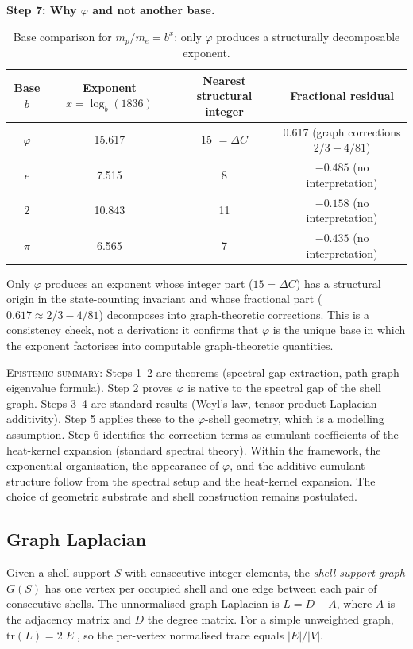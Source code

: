 \documentclass[12pt]{article}
\newcommand{\phig}{\varphi}
\begin{document}
\textbf{Step 7: Why $\phig$ and not another base.}

\begin{table}[ht]
\centering
\caption{Base comparison for $m_p/m_e = b^x$: only $\phig$ produces a structurally decomposable exponent.}
\label{tab:basecheck}
\begin{tabular}{@{}cccc@{}}
\toprule
Base $b$ & Exponent $x = \log_b(1836)$ & Nearest structural integer & Fractional residual \\
\midrule
$\phig$ & 15.617 & 15 $= \Delta C$ & 0.617 (graph corrections $2/3 - 4/81$) \\
$e$ & 7.515 & 8 & $-0.485$ (no interpretation) \\
$2$ & 10.843 & 11 & $-0.158$ (no interpretation) \\
$\pi$ & 6.565 & 7 & $-0.435$ (no interpretation) \\
\bottomrule
\end{tabular}
\end{table}

Only $\phig$ produces an exponent whose integer part ($15 = \Delta C$) has a structural origin in the state-counting invariant and whose fractional part ($0.617 \approx 2/3 - 4/81$) decomposes into graph-theoretic corrections. This is a consistency check, not a derivation: it confirms that $\phig$ is the unique base in which the exponent factorises into computable graph-theoretic quantities.

\textsc{Epistemic summary:} Steps 1--2 are theorems (spectral gap extraction, path-graph eigenvalue formula). Step 2 proves $\phig$ is native to the spectral gap of the shell graph. Steps 3--4 are standard results (Weyl's law, tensor-product Laplacian additivity). Step 5 applies these to the $\phig$-shell geometry, which is a modelling assumption. Step 6 identifies the correction terms as cumulant coefficients of the heat-kernel expansion (standard spectral theory). Within the framework, the exponential organisation, the appearance of $\phig$, and the additive cumulant structure follow from the spectral setup and the heat-kernel expansion. The choice of geometric substrate and shell construction remains postulated.

\subsection{Graph Laplacian}

Given a shell support $S$ with consecutive integer elements, the \textit{shell-support graph} $G(S)$ has one vertex per occupied shell and one edge between each pair of consecutive shells. The unnormalised graph Laplacian is $L = D - A$, where $A$ is the adjacency matrix and $D$ the degree matrix. For a simple unweighted graph, $\mathrm{tr}(L) = 2|E|$, so the per-vertex normalised trace equals $|E|/|V|$.
\end{document}
